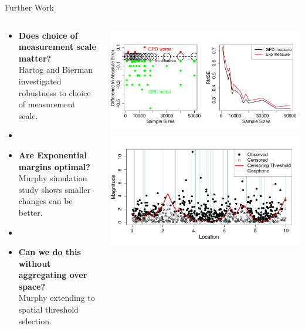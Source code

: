 \begin{frame}{Further Work}
\begin{columns}
\begin{column}{0.6\textwidth}
    \begin{itemize}
        \item \textbf{Does choice of measurement scale matter?} \checkmark \\ Hartog and Bierman investigated robustness to choice of measurement scale. 
        \item []
        \item \textbf{Are Exponential margins optimal?} \\ Murphy simulation study shows smaller changes can be better. 
        \item []
        \item \textbf{Can we do this without aggregating over space?} \checkmark  \\ Murphy extending to spatial threshold selection. 
    \end{itemize}
\end{column}
\begin{column}{0.4\textwidth}
\vspace{3em} 
 \includegraphics[width = \textwidth]{CaseStudy.pdf} \\
   \vspace{2em} 
    \includegraphics[width =  \textwidth]{Spatial_censoring_1D.3.pdf}
\end{column}
\end{columns}
\end{frame}


